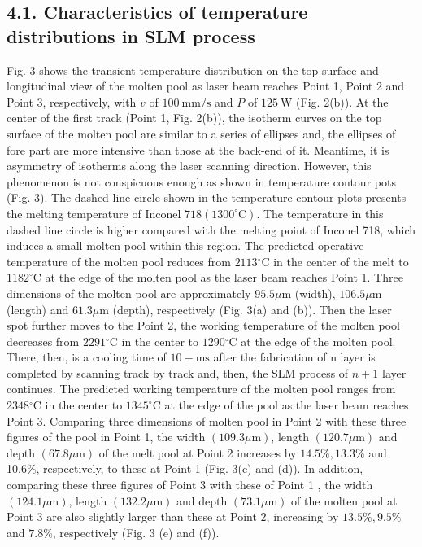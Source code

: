 \documentclass[10pt]{article}
\begin{document}
\subsection*{4.1. Characteristics of temperature distributions in SLM process}
Fig. 3 shows the transient temperature distribution on the top surface and longitudinal view of the molten pool as laser beam reaches Point 1, Point 2 and Point 3, respectively, with $v$ of $100 \mathrm{~mm} / \mathrm{s}$ and $P$ of $125 \mathrm{~W}$ (Fig. 2(b)). At the center of the first track (Point 1, Fig. 2(b)), the isotherm curves on the top surface of the molten pool are similar to a series of ellipses and, the ellipses of fore part are more intensive than those at the back-end of it. Meantime, it is asymmetry of isotherms along the laser scanning direction. However, this phenomenon is not conspicuous enough as shown in temperature contour pots (Fig. 3). The dashed line circle shown in the temperature contour plots presents the melting temperature of Inconel $718\left(1300^{\circ} \mathrm{C}\right)$. The temperature in this dashed line circle is higher compared with the melting point of Inconel 718, which induces a small molten pool within this region. The predicted operative temperature of the molten pool reduces from $2113{ }^{\circ} \mathrm{C}$ in the center of the melt to $1182^{\circ} \mathrm{C}$ at the edge of the molten pool as the laser beam reaches Point 1. Three dimensions of the molten pool are approximately $95.5 \mu \mathrm{m}$ (width), $106.5 \mu \mathrm{m}$ (length) and $61.3 \mu \mathrm{m}$ (depth), respectively (Fig. 3(a) and (b)). Then the laser spot further moves to the Point 2, the working temperature of the molten pool decreases from $2291{ }^{\circ} \mathrm{C}$ in the center to $1290{ }^{\circ} \mathrm{C}$ at the edge of the molten pool. There, then, is a cooling time of $10-\mathrm{ms}$ after the fabrication of $\mathrm{n}$ layer is completed by scanning track by track and, then, the SLM process of $n+1$ layer continues. The predicted working temperature of the molten pool ranges from $2348{ }^{\circ} \mathrm{C}$ in the center to $1345^{\circ} \mathrm{C}$ at the edge of the pool as the laser beam reaches Point 3. Comparing three dimensions of molten pool in Point 2 with these three figures of the pool in Point 1, the width $(109.3 \mu \mathrm{m})$, length $(120.7 \mu \mathrm{m})$ and depth $(67.8 \mu \mathrm{m})$ of the melt pool at Point 2 increases by $14.5 \%, 13.3 \%$ and 10.6\%, respectively, to these at Point 1 (Fig. 3(c) and (d)). In addition, comparing these three figures of Point 3 with these of Point 1 , the width $(124.1 \mu \mathrm{m})$, length $(132.2 \mu \mathrm{m})$ and depth $(73.1 \mu \mathrm{m})$ of the molten pool at Point 3 are also slightly larger than these at Point 2, increasing by $13.5 \%, 9.5 \%$ and $7.8 \%$, respectively (Fig. 3 (e) and (f)).
\end{document}
